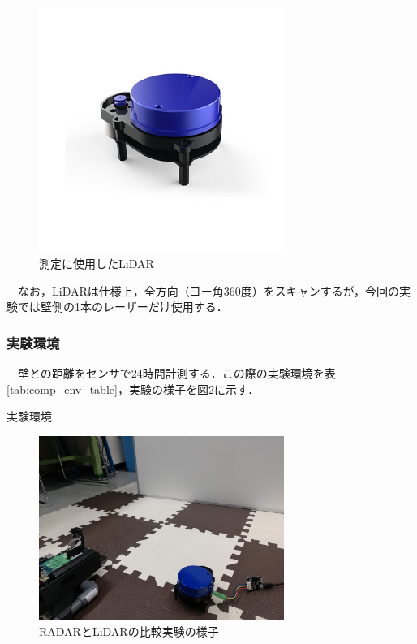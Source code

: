 \begin{figure}[H]
    \centering
    \includegraphics[width=8cm]{./fig/lidar.jpg}
    \caption{測定に使用したLiDAR}
    \label{fig:lidar}
\end{figure}
　なお，LiDARは仕様上，全方向（ヨー角360度）をスキャンするが，今回の実験では壁側の1本のレーザーだけ使用する．

\subsubsection{実験環境}
　壁との距離をセンサで24時間計測する．この際の実験環境を表\ref{tab:comp_env_table}，実験の様子を図\ref{fig:comparison_measure_environment}に示す．

\begin{table}[htbp]
    \centering
    \caption{実験環境}
    
    \label{tab:comp_env_table}
\end{table}

\begin{figure}[H]
    \centering
    \includegraphics[width=8cm]{./fig/comparison_measure_environment.jpg}
    \caption{RADARとLiDARの比較実験の様子}
    \label{fig:comparison_measure_environment}
\end{figure}

